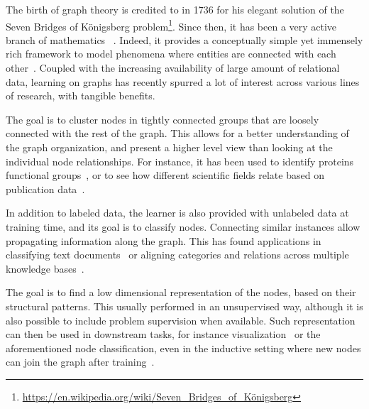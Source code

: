 The birth of graph theory is credited to \textcite{euler1741} in 1736 for his elegant solution of
the Seven Bridges of Königsberg
problem\footnote{\url{https://en.wikipedia.org/wiki/Seven_Bridges_of_Königsberg}}. Since then,
it has been a very active branch of mathematics ~\autocite{biggs1976graph}. Indeed, it provides a
conceptually simple yet immensely rich framework to model phenomena where entities are connected
with each other~\autocite{ComplexNetworksApp11}. Coupled with the increasing availability of large
amount of relational data, learning on graphs has recently spurred a lot of interest across various
lines of research, with tangible benefits.

\begin{description}[leftmargin=*]

  \item[community detection~\autocite{FortunatoSurvey10}] The goal is to cluster nodes in tightly
    connected groups that are loosely connected with the rest of the graph. This allows for a better
    understanding of the graph organization, and present a higher level view than looking at the
    individual node relationships. For instance, it has been used to identify proteins functional
    groups~\autocite{clusterBio03}, or to see how different scientific fields relate based on
    publication data~\autocite{clusterScience08}.

  \item[semi-supervised learning~\autocites{SSL06}{graphSSL14}] In addition to labeled data,
    the learner is also provided with unlabeled data at training time, and its goal is to classify
    nodes. Connecting similar instances allow propagating information along the graph. This has
    found applications in classifying text documents~\autocite{sslText09} or aligning categories and
    relations across multiple knowledge bases~\autocite{sslKB13}.


  \item[node embedding~\autocite{representationLearning17}] The goal is to find a low dimensional
    representation of the nodes, based on their structural patterns. This usually performed in an
    unsupervised way, although it is also possible to include problem supervision when available.
    Such representation can then be used in downstream tasks, for instance
    visualization~\autocite{LINE15} or the aforementioned node classification, even in the inductive
    setting where new nodes can join the graph after training~\autocite{inductiveRepresentation17}.


\end{description}
